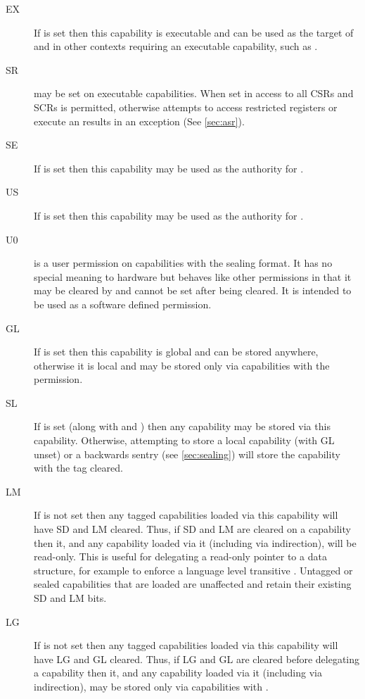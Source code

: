 \begin{description}
\item[EX] If \cappermX is set then this capability is executable and can be used as the target of  and in other contexts requiring an executable capability, such as .
\item[SR] \cappermASR{} may be set on executable capabilities.
When set in \PCC{} access to all CSRs and SCRs is permitted, otherwise attempts to access restricted registers or execute an  results in an exception (See \cref{sec:asr}).
\item[SE] If \cappermSeal is set then this capability may be used as the authority for .
\item[US] If \cappermUnseal is set then this capability may be used as the authority for .
\item[U0] \cappermUZ is a user permission on capabilities with the sealing format.
It has no special meaning to hardware but behaves like other permissions in that it may be cleared by  and cannot be set after being cleared.
It is intended to be used as a software defined permission.
\item[GL] If \cappermG is set then this capability is global and can be stored anywhere, otherwise it is local and may be stored only via capabilities with the \cappermSLC permission.
\item[SL] If \cappermSLC is set (along with \cappermS and \cappermMC) then any capability may be stored via this capability.
Otherwise, attempting to store a local capability (with GL unset) or a backwards sentry (see \cref{sec:sealing}) will store the capability with the tag cleared.
\item[LM] If \cappermLM is not set then any tagged capabilities loaded via this capability will have SD and LM cleared.
Thus, if SD and LM are cleared on a capability then it, and any capability loaded via it (including via indirection), will be read-only.
This is useful for delegating a read-only pointer to a data structure, for example to enforce a language level transitive .
Untagged or sealed capabilities that are loaded are unaffected and retain their existing SD and LM bits.
\item[LG] If \cappermILG is not set then any tagged capabilities loaded via this capability will have LG and GL cleared.
Thus, if LG and GL are cleared before delegating a capability then it, and any capability loaded via it (including via indirection), may be stored only via capabilities with \cappermSLC.

\end{description}

